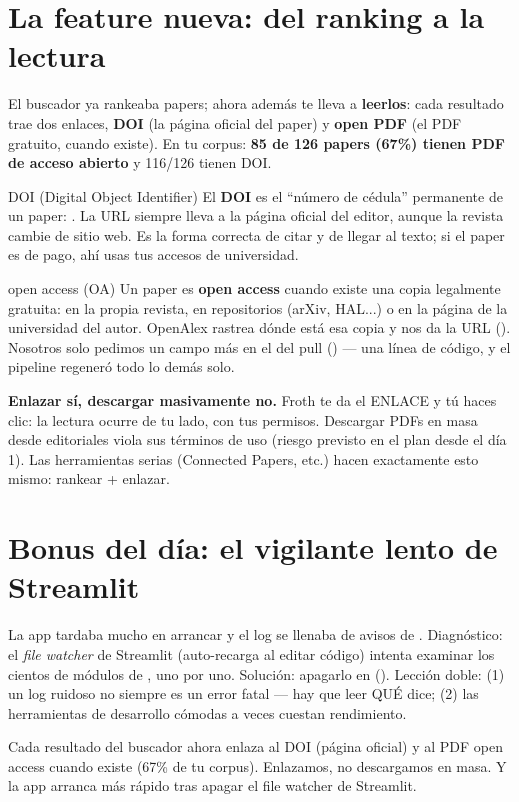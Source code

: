 \documentclass[11pt,a4paper]{article}
\begin{document}

\section{La feature nueva: del ranking a la lectura}

El buscador ya rankeaba papers; ahora además te lleva a \textbf{leerlos}: cada resultado
trae dos enlaces, \textbf{DOI} (la página oficial del paper) y \textbf{open PDF} (el PDF
gratuito, cuando existe). En tu corpus: \textbf{85 de 126 papers (67\%) tienen PDF de acceso
abierto} y 116/126 tienen DOI.

\begin{concepto}{DOI (Digital Object Identifier)}
El \textbf{DOI} es el ``número de cédula'' permanente de un paper: .
La URL  siempre lleva a la página oficial del editor, aunque
la revista cambie de sitio web. Es la forma correcta de citar y de llegar al texto; si el
paper es de pago, ahí usas tus accesos de universidad.
\end{concepto}

\begin{concepto}{open access (OA)}
Un paper es \textbf{open access} cuando existe una copia legalmente gratuita: en la propia
revista, en repositorios (arXiv, HAL...) o en la página de la universidad del autor. OpenAlex
rastrea dónde está esa copia y nos da la URL (). Nosotros solo pedimos un
campo más en el  del pull () — una línea de código,
y el pipeline regeneró todo lo demás solo.
\end{concepto}

\begin{ojo}
\textbf{Enlazar sí, descargar masivamente no.} Froth te da el ENLACE y tú haces clic: la
lectura ocurre de tu lado, con tus permisos. Descargar PDFs en masa desde editoriales viola
sus términos de uso (riesgo previsto en el plan desde el día 1). Las herramientas serias
(Connected Papers, etc.) hacen exactamente esto mismo: rankear + enlazar.
\end{ojo}

\section{Bonus del día: el vigilante lento de Streamlit}

La app tardaba mucho en arrancar y el log se llenaba de avisos de .
Diagnóstico: el \emph{file watcher} de Streamlit (auto-recarga al editar código) intenta
examinar los cientos de módulos de , uno por uno. Solución: apagarlo en
 (). Lección doble:
(1) un log ruidoso no siempre es un error fatal — hay que leer QUÉ dice; (2) las herramientas
de desarrollo cómodas a veces cuestan rendimiento.

\begin{resumen}
Cada resultado del buscador ahora enlaza al DOI (página oficial) y al PDF open access cuando
existe (67\% de tu corpus). Enlazamos, no descargamos en masa. Y la app arranca más rápido
tras apagar el file watcher de Streamlit.
\end{resumen}
\end{document}
